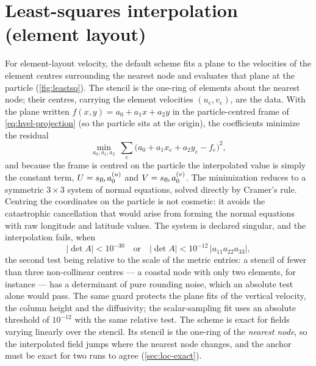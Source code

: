 
\section{Least-squares interpolation (element layout)}\label{sec:hvel-leastsq}

For element-layout velocity, the default scheme fits a plane to the velocities of
the element centres surrounding the nearest node and evaluates that plane at the
particle (\cref{fig:leastsq}). The stencil is the one-ring of elements about the
nearest node; their centres, carrying the element velocities $(u_e,v_e)$, are the
data. With the plane written $f(x,y)=a_0+a_1 x + a_2 y$ in the particle-centred
frame of \cref{eq:hvel-projection} (so the particle sits at the origin), the
coefficients minimize the residual
\begin{equation}\label{eq:leastsq}
  \min_{a_0,a_1,a_2}\ \sum_{e} \bigl(a_0 + a_1 x_e + a_2 y_e - f_e\bigr)^2 ,
\end{equation}
and because the frame is centred on the particle the interpolated value is simply
the constant term, $U=s_{\mathrm{fb}}\,a_0^{(u)}$ and $V=s_{\mathrm{fb}}\,a_0^{(v)}$. The minimization
reduces to a symmetric $3\times3$ system of normal equations, solved directly by
Cramer's rule. Centring the coordinates on the particle is not cosmetic: it avoids the
catastrophic cancellation that would arise from forming the normal equations with
raw longitude and latitude values. The system is declared singular, and the interpolation fails, when
\begin{equation}\label{eq:leastsq-guard}
  |\det A|<10^{-30}\quad\text{or}\quad |\det A|<10^{-12}\,|a_{11}a_{22}a_{33}| ,
\end{equation}
the second test being relative to the scale of the metric entries: a stencil of fewer than three
non-collinear centres --- a coastal node with only two elements, for instance --- has a determinant
of pure rounding noise, which an absolute test alone would pass. The same guard protects the
plane fits of the vertical velocity, the column height and the diffusivity; the scalar-sampling fit uses
an absolute threshold of $10^{-12}$ with the same relative test. The scheme is
exact for fields varying linearly over the stencil. Its stencil is the one-ring of the \emph{nearest
node}, so the interpolated field jumps where the nearest node changes, and the anchor must be exact
for two runs to agree (\cref{sec:loc-exact}).

